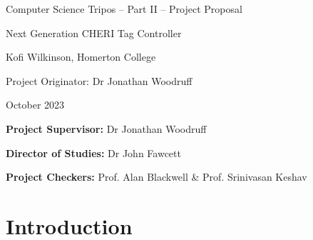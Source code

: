 \documentclass[10pt,a4paper]{article}
\begin{document}
{\centering \Large Computer Science Tripos -- Part II -- Project Proposal\par}
\vspace{1cm}
{\centering \Huge Next Generation CHERI Tag Controller\par}
\vspace{1.5cm}
{\centering \large Kofi Wilkinson, Homerton College\par}
{\centering \large Project Originator: Dr Jonathan Woodruff\par}
{\centering \large {} October 2023\par}
\vspace{1.5cm}


\textbf{Project Supervisor:} Dr Jonathan Woodruff\par
\textbf{Director of Studies:} Dr John Fawcett\par
\textbf{Project Checkers:} Prof. Alan Blackwell \& Prof. Srinivasan Keshav
\vspace{2cm}


\section*{Introduction}
\end{document}
